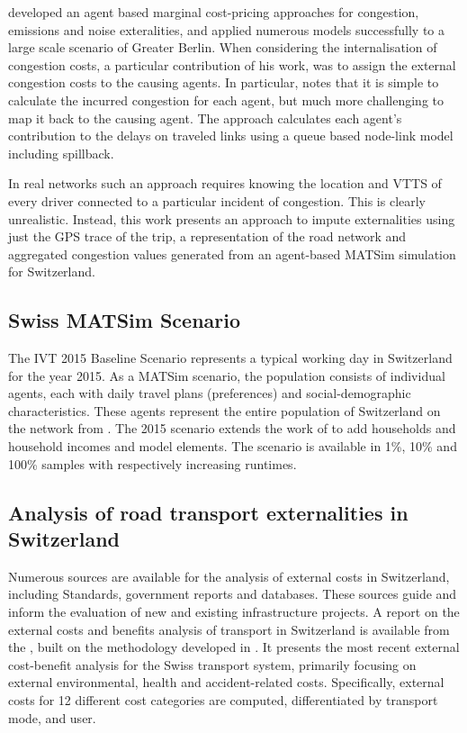 \citet{kaddoura2015marginal} developed an agent based marginal cost-pricing approaches for congestion, emissions and noise exteralities, and applied numerous models successfully to a large scale scenario of Greater Berlin.
When considering the internalisation of congestion costs, a particular contribution of his work, was to assign the external congestion costs to the causing agents.
In particular, \citet{kaddoura2015marginal} notes that it is simple to calculate the incurred congestion for each agent, but much more challenging to map it back to the causing agent.
The approach calculates each agent's contribution to the delays on traveled links using a queue based node-link model including spillback.

In real networks such an approach requires knowing the location and VTTS of every driver connected to a particular incident of congestion.
This is clearly unrealistic. Instead, this work presents an approach to impute externalities using just the GPS trace of the trip, a representation of the road network and aggregated congestion values generated from an agent-based MATSim simulation for Switzerland.

\subsection{Swiss MATSim Scenario}
The IVT 2015 Baseline Scenario \cite{boesch2015ivt} represents a typical working day in Switzerland for the year 2015.
As a MATSim scenario, the population consists of individual agents, each with daily travel plans (preferences) and social-demographic characteristics.
These agents represent the entire population of Switzerland on the network from \cite{boesch2015network}.
The 2015 scenario extends the work of \cite{Balmer2007switzerland} to add households and household incomes and model elements. The scenario is available in 1\%, 10\% and 100\% samples with respectively increasing runtimes. 

\subsection{Analysis of road transport externalities in Switzerland}  %

Numerous sources are available for the analysis of external costs in Switzerland, including Standards, government reports and databases. These sources guide and inform the evaluation of new and existing infrastructure projects. A report on the external costs and benefits analysis of transport in Switzerland is available from the \citet{are2016externalcosts}, built on the methodology developed in \cite{ecoplaninfras2014externeeffekte}.
It presents the most recent external cost-benefit analysis for the Swiss transport system, primarily focusing on external environmental, health and accident-related costs.
Specifically, external costs for 12 different cost categories are computed, differentiated by transport mode,  and user. 

